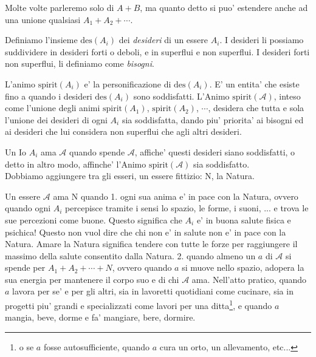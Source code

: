 Molte volte parleremo solo di $A+B$, ma quanto detto si puo' estendere anche ad una unione qualsiasi $A_1+A_2+\cdots$. \\

\def\des{\textrm{des}}

Definiamo l'insieme $\des(A_i)$ dei \emph{desideri} di un essere $A_i$. I desideri li possiamo suddividere in desideri forti o deboli, e in superflui e non superflui. I desideri forti non superflui, li definiamo come \emph{bisogni}.

\def\anima#1{\mathcal{#1}}

\def\spirit#1{\textrm{spirit}(#1)}
\def\Animo#1{\spirit{\anima{#1}}}

L'animo $\spirit{A_i}$ e' la personificazione di $\des(A_i)$. E' un entita' che esiste fino a quando i desideri $\des(A_i)$ sono soddisfatti. L'Animo $\Animo{A}$, inteso come l'unione degli animi $\spirit{A_1}$, $\spirit{A_2}$, $\cdots$,  desidera che tutta e sola l'unione dei desideri di ogni $A_i$ sia soddisfatta, dando piu' priorita' ai bisogni ed ai desideri che lui considera non superflui che agli altri desideri.

Un Io $A_i$ ama $\anima{A}$ quando spende $\anima{A}$, affiche' questi desideri siano soddisfatti, o detto in altro modo, affinche' l'Animo $\Animo{A}$ sia soddisfatto.\\

Dobbiamo aggiungere tra gli esseri, un essere fittizio: N, la Natura.

Un essere $\anima{A}$ ama N quando 1. ogni sua anima e' in pace con la Natura, ovvero quando ogni $A_i$ percepisce tramite i sensi lo spazio, le forme, i suoni, ... e trova le sue percezioni come buone. Questo significa che $A_i$ e' in buona salute fisica e psichica! Questo non vuol dire che chi non e' in salute non e' in pace con la Natura. Amare la Natura significa tendere con tutte le forze per raggiungere il massimo della salute consentito dalla Natura. 2. quando almeno un $a$ di $\anima{A}$ si spende per $A_1+A_2+\cdots+N$, ovvero quando $a$ si muove nello spazio, adopera la sua energia per mantenere il corpo suo e di chi $\anima{A}$ ama. Nell'atto pratico, quando $a$ lavora per se' e per gli altri, sia in lavoretti quotidiani come cucinare, sia in progetti piu' grandi e specializzati come lavori per una ditta\footnote{o se $a$ fosse autosufficiente, quando $a$ cura un orto, un allevamento, etc...}, e quando $a$ mangia, beve, dorme e fa' mangiare, bere, dormire. \\


